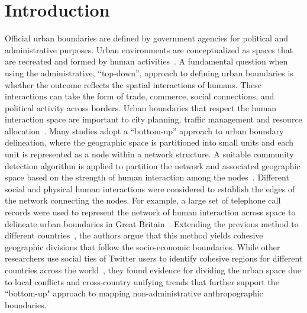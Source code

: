 \documentclass[]{tGIS2e}
\begin{document}
\section{Introduction}
Official urban boundaries are defined by government agencies for political and administrative purposes.
Urban environments are conceptualized as spaces that are recreated and formed by human activities~\citep{schliephake}.
A fundamental question when using the administrative, ``top-down'', approach to defining urban boundaries is whether the outcome reflects the spatial interactions of humans.
These interactions can take the form of trade, commerce, social connections, and political activity across borders.
Urban boundaries that respect the human interaction space are important to city planning, traffic management and resource allocation~\citep{gao2014, jiang2015,liu2015,long2015}.
Many studies adopt a ``bottom-up'' approach to urban boundary delineation, where the geographic space is partitioned into small units and each unit is represented as a node within a network structure.
A suitable community detection algorithm is applied to partition the network and associated geographic space based on the strength of human interaction among the nodes~\citep{lancichinetti2009}.
Different social and physical human interactions were considered to establish the edges of the network connecting the nodes.
For example, a large set of telephone call records were used to represent the network of human interaction across space to delineate urban boundaries in Great Britain~\citep{ratti2010}.
Extending the previous method to different countries~\citep{sobolevsky2013}, the authors argue that this method yields cohesive geographic divisions that follow the socio-economic boundaries.
While other researchers use social ties of Twitter users to identify cohesive regions for different countries across the world~\citep{kallus2015}, they found evidence for dividing the urban space due to local conflicts and cross-country unifying trends that further support the ``bottom-up" approach to mapping non-administrative anthropographic boundaries.
\end{document}
